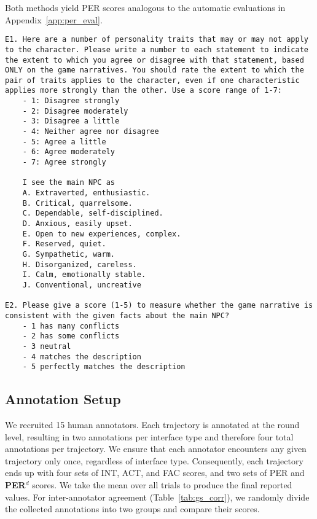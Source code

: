 Both methods yield PER scores analogous to the automatic evaluations in Appendix~\ref{app:per_eval}.

\begin{center}
\begin{minipage}{0.95\textwidth}
\begin{lstlisting}[language=plaintext, frame=none, numbers=none]
E1. Here are a number of personality traits that may or may not apply to the character. Please write a number to each statement to indicate the extent to which you agree or disagree with that statement, based ONLY on the game narratives. You should rate the extent to which the pair of traits applies to the character, even if one characteristic applies more strongly than the other. Use a score range of 1-7:
    - 1: Disagree strongly
    - 2: Disagree moderately
    - 3: Disagree a little
    - 4: Neither agree nor disagree
    - 5: Agree a little
    - 6: Agree moderately
    - 7: Agree strongly

    I see the main NPC as
    A. Extraverted, enthusiastic.
    B. Critical, quarrelsome.
    C. Dependable, self-disciplined.
    D. Anxious, easily upset.
    E. Open to new experiences, complex.
    F. Reserved, quiet.
    G. Sympathetic, warm.
    H. Disorganized, careless.
    I. Calm, emotionally stable.
    J. Conventional, uncreative

E2. Please give a score (1-5) to measure whether the game narrative is consistent with the given facts about the main NPC?
    - 1 has many conflicts
    - 2 has some conflicts
    - 3 neutral
    - 4 matches the description
    - 5 perfectly matches the description
\end{lstlisting}
\end{minipage}
\end{center}
\subsection{Annotation Setup}
We recruited 15 human annotators. Each trajectory is annotated at the round level, resulting in two annotations per interface type and therefore four total annotations per trajectory. We ensure that each annotator encounters any given trajectory only once, regardless of interface type. Consequently, each trajectory ends up with four sets of INT, ACT, and FAC scores, and two sets of PER and \textbf{PER}$^d$ scores. We take the mean over all trials to produce the final reported values. For inter-annotator agreement (Table~\ref{tab:gs_corr}), we randomly divide the collected annotations into two groups and compare their scores.

